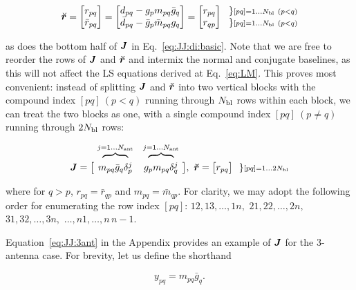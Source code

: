 \documentclass[useAMS,usenatbib]{mn2e}
\makeatletter
\newcommand{\mat}[1]{{\bmath{#1}}}
\newcommand{\JJ}{\mat{J}} %
\newcommand{\Matrix}[2]{\left [ \begin{array}{@{}#1@{}}#2\end{array} \right ]}
\newcommand{\Stack}[1]{\begin{array}{@{}c@{}}#1\end{array}}
\newcommand{\AUG}[1]{\bmath{\breve{#1}}}
\newcommand{\Rr}{\AUG{r}}
\numberwithin{equation}{section} %
\providecommand{\DIFaddbegin}{} %
\providecommand{\DIFaddend}{} %
\providecommand{\DIFdelbegin}{} %
\providecommand{\DIFdelend}{} %
\makeatother
\begin{document}
\DIFdelend \DIFaddbegin \begin{equation}
\DIFaddend \Rr = \Matrix{c}{ r_{pq} \\ \bar{r}_{pq} } = \Matrix{c}{d_{pq}-g_p m_{pq}\bar{g}_q\\ \bar{d}_{pq}-\bar{g}_p \bar{m}_{pq}g_q} = 
\Matrix{c}{ r_{pq} \\ r_{qp} }~~ 
\Stack{ \} \scriptstyle [pq]=1\dots \Nbl~(p<q) \\ \} \scriptstyle [pq]=1\dots \Nbl~(p<q) }
\DIFdelbegin %
\end{equation}%

\begin{equation}%
\DIFdelend \DIFaddbegin \end{equation}
\DIFaddend as does the bottom half of $\JJ$ in Eq.~\ref{eq:JJ:di:basic}. Note that we are free to reorder the rows of $\JJ$ and $\Rr$ 
and intermix the normal and conjugate baselines, as this will not affect the LS equations derived at Eq.~\ref{eq:LM}.
This proves most convenient: instead of splitting $\JJ$ and $\Rr$ into 
two vertical blocks with the compound index $[pq]~(p<q)$ running through $N_\mathrm{bl}$ rows within each block, we can treat 
the two blocks as one, with a single compound index $[pq]~(p\ne q)$ running through $2N_\mathrm{bl}$ rows:
\DIFdelbegin %

\DIFdelend \begin{equation}
\label{eq:JJ:di}
\begin{array}{r@{~}cc@{~}cc}
                & \overbrace{~~~~~~~~}^{j=1\dots \Na} & \overbrace{~~~~~~~~}^{j=1\dots \Na} \\
\JJ = \big [ & m_{pq}\bar{g}_q\delta^{j}_p & g_p m_{pq} \delta^{j}_q & \big ],~
\Rr = \big [ r_{pq} \big ] ~~{\} \scriptstyle [pq]=1\dots 2\Nbl}
\end{array}
\end{equation}
\DIFdelbegin %

\DIFdelend where for $q>p$, $r_{pq}=\bar{r}_{qp}$ and $m_{pq}=\bar{m}_{qp}$. For clarity, we may adopt the 
following order for enumerating the row index $[pq]$: $12,13,\dots,1n,$ $21,22,\dots,2n,$ $31,32,\dots,3n,$ $\dots,n1,\dots,n\,n-1$. 

Equation~\ref{eq:JJ:3ant} in the Appendix provides an example of $\JJ$ for the 3-antenna case. For
brevity, let us define the shorthand 
\DIFdelbegin %

\DIFdelend \DIFaddbegin \begin{equation}
\DIFaddend y_{pq} = m_{pq} \bar{g}_q. 
\DIFdelbegin %
\end{equation}%
\end{document}
